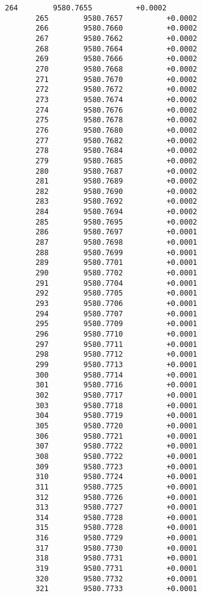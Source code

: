 \documentclass[11pt]{article}
\begin{document}
\begin{Verbatim}[commandchars=\\\{\}]
       264        9580.7655          +0.0002
       265        9580.7657          +0.0002
       266        9580.7660          +0.0002
       267        9580.7662          +0.0002
       268        9580.7664          +0.0002
       269        9580.7666          +0.0002
       270        9580.7668          +0.0002
       271        9580.7670          +0.0002
       272        9580.7672          +0.0002
       273        9580.7674          +0.0002
       274        9580.7676          +0.0002
       275        9580.7678          +0.0002
       276        9580.7680          +0.0002
       277        9580.7682          +0.0002
       278        9580.7684          +0.0002
       279        9580.7685          +0.0002
       280        9580.7687          +0.0002
       281        9580.7689          +0.0002
       282        9580.7690          +0.0002
       283        9580.7692          +0.0002
       284        9580.7694          +0.0002
       285        9580.7695          +0.0002
       286        9580.7697          +0.0001
       287        9580.7698          +0.0001
       288        9580.7699          +0.0001
       289        9580.7701          +0.0001
       290        9580.7702          +0.0001
       291        9580.7704          +0.0001
       292        9580.7705          +0.0001
       293        9580.7706          +0.0001
       294        9580.7707          +0.0001
       295        9580.7709          +0.0001
       296        9580.7710          +0.0001
       297        9580.7711          +0.0001
       298        9580.7712          +0.0001
       299        9580.7713          +0.0001
       300        9580.7714          +0.0001
       301        9580.7716          +0.0001
       302        9580.7717          +0.0001
       303        9580.7718          +0.0001
       304        9580.7719          +0.0001
       305        9580.7720          +0.0001
       306        9580.7721          +0.0001
       307        9580.7722          +0.0001
       308        9580.7722          +0.0001
       309        9580.7723          +0.0001
       310        9580.7724          +0.0001
       311        9580.7725          +0.0001
       312        9580.7726          +0.0001
       313        9580.7727          +0.0001
       314        9580.7728          +0.0001
       315        9580.7728          +0.0001
       316        9580.7729          +0.0001
       317        9580.7730          +0.0001
       318        9580.7731          +0.0001
       319        9580.7731          +0.0001
       320        9580.7732          +0.0001
       321        9580.7733          +0.0001

\end{Verbatim}
\end{document}
